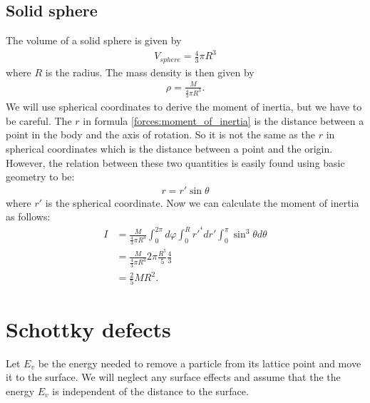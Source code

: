 \subsection{Solid sphere}

    The volume of a solid sphere is given by
    \begin{gather}
        V_{sphere} = \frac{4}{3}\pi R^3
    \end{gather}
    where $R$ is the radius. The mass density is then given by
    \begin{gather}
        \rho = \frac{M}{\frac{4}{3}\pi R^3}.
    \end{gather}
    We will use spherical coordinates to derive the moment of inertia, but we have to be careful. The $r$ in formula \ref{forces:moment_of_inertia} is the distance between a point in the body and the axis of rotation. So it is not the same as the $r$ in spherical coordinates which is the distance between a point and the origin. However, the relation between these two quantities is easily found using basic geometry to be:
    \begin{gather}
        r = r'\sin\theta
    \end{gather}
    where $r'$ is the spherical coordinate. Now we can calculate the moment of inertia as follows:
    \begin{align}
        I &= \frac{M}{\frac{4}{3}\pi R^3} \int_0^{2\pi}d\varphi\int_0^Rr'^{^4}dr'\int_0^\pi\sin^3\theta d\theta\\
        &= \frac{M}{\frac{4}{3}\pi R^3} 2\pi \frac{R^5}{5} \frac{4}{3}\\
        &= \frac{2}{5}MR^2.
    \end{align}

\section{Schottky defects}\label{deriv:schottky_defects}
    Let $E_v$ be the energy needed to remove a particle from its lattice point and move it to the surface. We will neglect any surface effects and assume that the the energy $E_v$ is independent of the distance to the surface.

